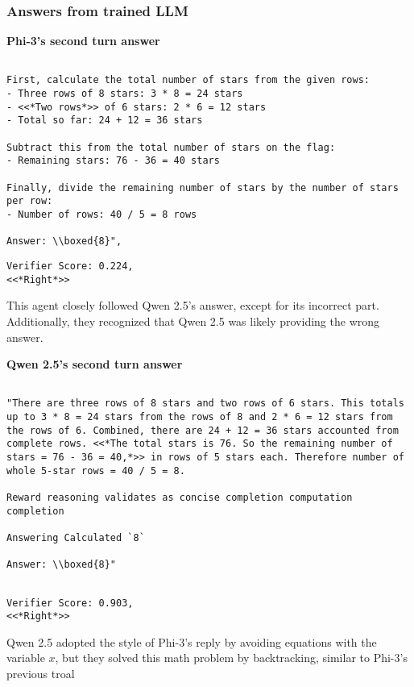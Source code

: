 \subsubsection{Answers from \oursspace trained LLM}
\textbf{Phi-3's second turn answer }
\begin{lstlisting}

First, calculate the total number of stars from the given rows:
- Three rows of 8 stars: 3 * 8 = 24 stars
- <<*Two rows*>> of 6 stars: 2 * 6 = 12 stars
- Total so far: 24 + 12 = 36 stars

Subtract this from the total number of stars on the flag:
- Remaining stars: 76 - 36 = 40 stars

Finally, divide the remaining number of stars by the number of stars per row:
- Number of rows: 40 / 5 = 8 rows

Answer: \\boxed{8}",

\end{lstlisting}
\begin{lstlisting}
Verifier Score: 0.224,
<<*Right*>> 
\end{lstlisting}
This agent closely followed Qwen 2.5's answer, except for its incorrect part. Additionally, they recognized that Qwen 2.5 was likely providing the wrong answer.


\textbf{Qwen 2.5's second turn answer }
\begin{lstlisting}

"There are three rows of 8 stars and two rows of 6 stars. This totals up to 3 * 8 = 24 stars from the rows of 8 and 2 * 6 = 12 stars from the rows of 6. Combined, there are 24 + 12 = 36 stars accounted from complete rows. <<*The total stars is 76. So the remaining number of stars = 76 - 36 = 40,*>> in rows of 5 stars each. Therefore number of whole 5-star rows = 40 / 5 = 8.

Reward reasoning validates as concise completion computation completion

Answering Calculated `8`

Answer: \\boxed{8}"


\end{lstlisting}
\begin{lstlisting}
Verifier Score: 0.903,
<<*Right*>> 
\end{lstlisting}
Qwen 2.5 adopted the style of Phi-3's reply by avoiding equations with the variable $x$, but they solved this math problem by  backtracking, similar to Phi-3’s previous troal 



